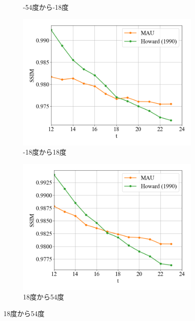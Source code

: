 \begin{figure}[htbp]
\begin{subfigure}{0.5\textwidth}
              \caption{-54度から-18度}
            \end{subfigure} \par
            \begin{subfigure}{0.5\textwidth}
              \centering
              \includegraphics[width=\textwidth]{figures/exp2/lng_ssim_3.png}
              \caption{-18度から18度}
            \end{subfigure}
            \begin{subfigure}{0.5\textwidth}
              \centering
              \includegraphics[width=\textwidth]{figures/exp2/lng_ssim_4.png}
              \caption{18度から54度}
            \end{subfigure} \par

\end{figure}
